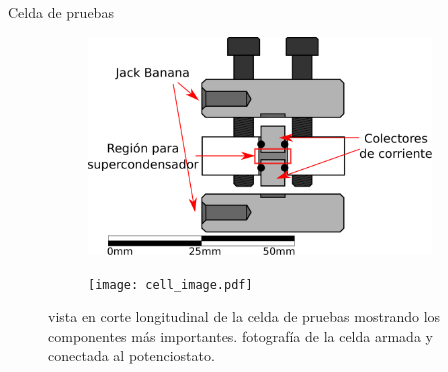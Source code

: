 \documentclass[aspectratio=169]{beamer}
\begin{document}
	\begin{frame}{Celda de pruebas}
		\begin{figure}[h!]
			\centering
			{
				\begin{subfigure}[b]{0.6\textwidth}
					\includegraphics[width=\textwidth]{cell_scheme.pdf}
					\caption{}
					\label{fig:cell_scheme}
				\end{subfigure}\hfill
				\begin{subfigure}[b]{0.25\textwidth}
					\texttt{[image: cell\_image.pdf]}
					\caption{}
					\label{fig:cell_image}
				\end{subfigure}
			}
			\caption[Celda de pruebas de supercondensador]{ vista en corte longitudinal de la celda de pruebas mostrando los componentes más importantes.  fotografía de la celda armada y conectada al potenciostato.}
			\label{fig:celda_de_pruebas_SC}
		\end{figure}
	\end{frame}
	
\end{document}
